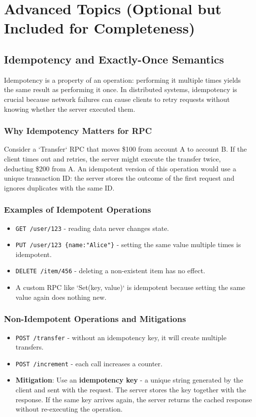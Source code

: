 \documentclass[a4paper]{article}
\begin{document}
\section{Advanced Topics (Optional but Included for Completeness)}

\subsection{Idempotency and Exactly-Once Semantics}
Idempotency is a property of an operation: performing it multiple times yields the same result as performing it once. In distributed systems, idempotency is crucial because network failures can cause clients to retry requests without knowing whether the server executed them.

\subsubsection{Why Idempotency Matters for RPC}
Consider a `Transfer` RPC that moves \$100 from account A to account B. If the client times out and retries, the server might execute the transfer twice, deducting \$200 from A. An idempotent version of this operation would use a unique transaction ID: the server stores the outcome of the first request and ignores duplicates with the same ID.

\subsubsection{Examples of Idempotent Operations}
\begin{itemize}
    \item \texttt{GET /user/123} - reading data never changes state.
    \item \texttt{PUT /user/123 \{name:"Alice"\}} - setting the same value multiple times is idempotent.
    \item \texttt{DELETE /item/456} - deleting a non-existent item has no effect.
    \item A custom RPC like `Set(key, value)` is idempotent because setting the same value again does nothing new.
\end{itemize}

\subsubsection{Non-Idempotent Operations and Mitigations}
\begin{itemize}
    \item \texttt{POST /transfer} - without an idempotency key, it will create multiple transfers.
    \item \texttt{POST /increment} - each call increases a counter.
    \item \textbf{Mitigation}: Use an \textbf{idempotency key} - a unique string generated by the client and sent with the request. The server stores the key together with the response. If the same key arrives again, the server returns the cached response without re-executing the operation.
\end{itemize}
\end{document}
